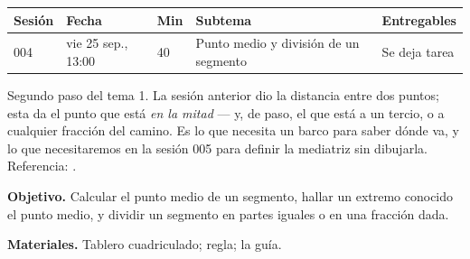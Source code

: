 \documentclass[11pt]{article}
\begin{document}
\encabezado*

\begin{center}
{\renewcommand{\arraystretch}{1.3}
\begin{tabularx}{\linewidth}{@{}l l l X l@{}}
  \toprule
  \textbf{Sesión} & \textbf{Fecha} & \textbf{Min} & \textbf{Subtema} & \textbf{Entregables}\\
  \midrule
  004 & vie 25 sep., 13:00 & 40 & Punto medio y división de un segmento & Se deja tarea\\
  \bottomrule
\end{tabularx}}
\end{center}

Segundo paso del tema 1. La sesión anterior dio la distancia entre dos puntos; esta da el
punto que está \emph{en la mitad} — y, de paso, el que está a un tercio, o a cualquier
fracción del camino. Es lo que necesita un barco para saber dónde va, y lo que necesitaremos
en la sesión 005 para definir la mediatriz sin dibujarla.
Referencia: .


\textbf{Objetivo.} Calcular el punto medio de un segmento, hallar un extremo conocido el punto
medio, y dividir un segmento en partes iguales o en una fracción dada.

\textbf{Materiales.} Tablero cuadriculado; regla; la guía.
\end{document}
